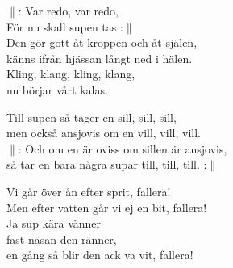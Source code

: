 \documentclass[a6paper, 10pt, twoside]{article}
\begin{document}
\noindent
\begin{center}
\end{center}
\begin{lyrics}
$\|$: Var redo, var redo, \\
För nu skall supen tas :$\|$\\
Den gör gott åt kroppen och åt själen, \\
känns ifrån hjässan långt ned i hälen. \\
Kling, klang, kling, klang, \\
nu börjar vårt kalas. 
\end{lyrics}
\vspace{20pt}
\begin{center}
\end{center}
\begin{lyrics}
Till supen så tager en sill, sill, sill, \\
men också ansjovis om en vill, vill, vill. \\
$\|$: Och om en är oviss om sillen är ansjovis, \\
så tar en bara några supar till, till, till. :$\|$
\end{lyrics}
\vspace{20pt}
\begin{center}
\end{center}
\begin{lyrics}
Vi går över ån efter sprit, fallera!\\
Men efter vatten går vi ej en bit, fallera!\\
Ja sup kära vänner\\
fast näsan den ränner,\\
en gång så blir den ack va vit, fallera!
\end{lyrics}
\end{document}
